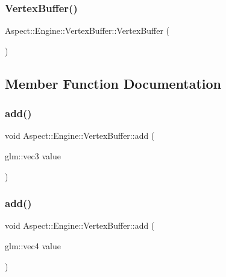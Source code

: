 \subsubsection{\texorpdfstring{Vertex\+Buffer()}{VertexBuffer()}}
{\footnotesize\ttfamily Aspect\+::\+Engine\+::\+Vertex\+Buffer\+::\+Vertex\+Buffer (\begin{DoxyParamCaption}{ }\end{DoxyParamCaption})}



\subsection{Member Function Documentation}
\mbox{\label{class_aspect_1_1_engine_1_1_vertex_buffer_a4fb009bcbc95ee2db02630dd4b4b5540}} 
\subsubsection{\texorpdfstring{add()}{add()}\hspace{0.1cm}{\footnotesize\ttfamily [1/3]}}
{\footnotesize\ttfamily void Aspect\+::\+Engine\+::\+Vertex\+Buffer\+::add (\begin{DoxyParamCaption}\item[{glm\+::vec3}]{value }\end{DoxyParamCaption})}

\mbox{\label{class_aspect_1_1_engine_1_1_vertex_buffer_a8aaf8b66be2c477e198db444462bf6be}} 
\subsubsection{\texorpdfstring{add()}{add()}\hspace{0.1cm}{\footnotesize\ttfamily [2/3]}}
{\footnotesize\ttfamily void Aspect\+::\+Engine\+::\+Vertex\+Buffer\+::add (\begin{DoxyParamCaption}\item[{glm\+::vec4}]{value }\end{DoxyParamCaption})}

